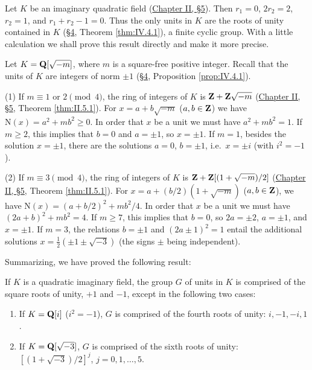 Let $K$ be an imaginary quadratic field (\hyperref[sec:2.5]{Chapter II, §5}). Then $r_{1}=0$,
$2r_{2}=2$, $r_{2}=1$, and $r_{1}+r_{2}-1=0$. Thus the only units in $K$ are
the roots of unity contained in $K$ (\hyperref[sec:4.4]{§4}, Theorem \ref{thm:IV.4.1}), a finite
cyclic group. With a little calculation we shall prove this result directly
and make it more precise.

Let $K=\mathbf{Q}[\sqrt{-m}]$, where $m$ is a square-free positive integer. Recall
that the units of $K$ are integers of norm $\pm1$ (\hyperref[sec:4.4]{§4}, Proposition
\ref{prop:IV.4.1}).

(1) If $m\equiv1$ or $2\pmod{4}$, the ring of integers of $K$ is
$\mathbf{Z}+\mathbf{Z}\sqrt{-m}$ (\hyperref[sec:2.5]{Chapter II, §5}, Theorem \ref{thm:II.5.1}). For
$x=a+b\sqrt{-m}$ ($a,b\in\mathbf{Z}$) we have $\mathrm{N}(x)=a^{2}+mb^{2}\geq0$. In order
that $x$ be a unit we must have $a^{2}+mb^{2}=1$. If $m\geq2$, this implies
that $b=0$ and $a=\pm1$, so $x=\pm1$. If $m=1$, besides the solution
$x=\pm1$, there are the solutions $a=0$, $b=\pm1$, i.e.\ $x=\pm i$ (with
$i^{2}=-1$).

(2) If $m\equiv3\pmod{4}$, the ring of integers of $K$ is
$\mathbf{Z}+\mathbf{Z}[(1+\sqrt{-m})/2]$ (\hyperref[sec:2.5]{Chapter II, §5}, Theorem \ref{thm:II.5.1}). For
$x=a+(b/2)(1+\sqrt{-m})$ ($a,b\in\mathbf{Z}$), we have
$\mathrm{N}(x)=(a+b/2)^{2}+mb^{2}/4$. In order that $x$ be a unit we must have
$(2a+b)^{2}+mb^{2}=4$. If $m\geq7$, this implies that $b=0$, so $2a=\pm2$,
$a=\pm1$, and $x=\pm1$. If $m=3$, the relations $b=\pm1$ and
$(2a\pm1)^{2}=1$ entail the additional solutions
$x=\frac{1}{2}(\pm1\pm\sqrt{-3})$ (the signs $\pm$ being independent).

Summarizing, we have proved the following result:

\begin{proposition}
\label{prop:IV.5.1}
If $K$ is a quadratic imaginary field, the group $G$ of units in $K$ is
comprised of the square roots of unity, $+1$ and $-1$, except in the
following two cases:
\begin{enumerate}[label=(\arabic*),leftmargin=2.0em,itemsep=0.1ex,topsep=0.3ex]
\item If $K=\mathbf{Q}[i]$ ($i^{2}=-1$), $G$ is comprised of the fourth roots of
unity: $i,-1,-i,1$.
\item If $K=\mathbf{Q}[\sqrt{-3}]$, $G$ is comprised of the sixth roots of unity:
$[(1+\sqrt{-3})/2]^{j}$, $j=0,1,\ldots,5$.
\end{enumerate}
\end{proposition}

